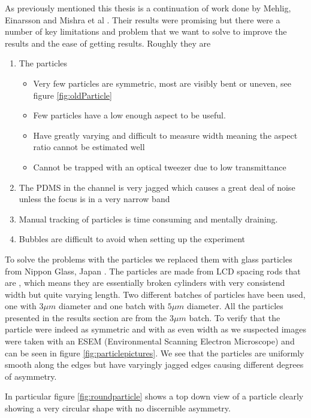As previously mentioned this thesis is a continuation of work done by Mehlig, Einarsson and Mishra et al \cite{AntonThesis, JonasExperiment}. Their results were promising but there were a number of key limitations and problem that we want to solve to improve the results and the ease of getting results. Roughly they are
\begin{enumerate}
	\item The particles
	\begin{itemize}
		\item Very few particles are symmetric, most are visibly bent or uneven, see figure \ref{fig:oldParticle}
		\item Few particles have a low enough aspect to be useful.
		\item Have greatly varying and difficult to measure width meaning the aspect ratio cannot be estimated well
		\item Cannot be trapped with an optical tweezer due to low transmittance
	\end{itemize}
	\item The PDMS in the channel is very jagged which causes a great deal 
			of noise unless the focus is in a very narrow band
	\item Manual tracking of particles is time consuming and mentally draining.
	\item Bubbles are difficult to avoid when setting up the experiment
\end{enumerate}

To solve the problems with the particles we replaced them with glass particles from Nippon Glass, Japan \cite{Particles}. The particles are made from LCD spacing rods that are , which means they are essentially broken cylinders with very consistend width but quite varying length. Two different batches of particles have been used, one with $3\mu m$ diameter and one batch with $5 \mu m$ diameter. All the particles presented in the results section are from the $3 \mu m$ batch. To verify that the particle were indeed as symmetric and with as even width as we suspected images were taken with an ESEM (Environmental Scanning Electron Microscope) and can be seen in figure \ref{fig:particlepictures}. We see that the particles are uniformly smooth along the edges but have varyingly jagged edges causing different degrees of asymmetry. 

In particular figure \ref{fig:roundparticle} shows a top down view of a particle clearly showing a very circular shape with no discernible asymmetry.

